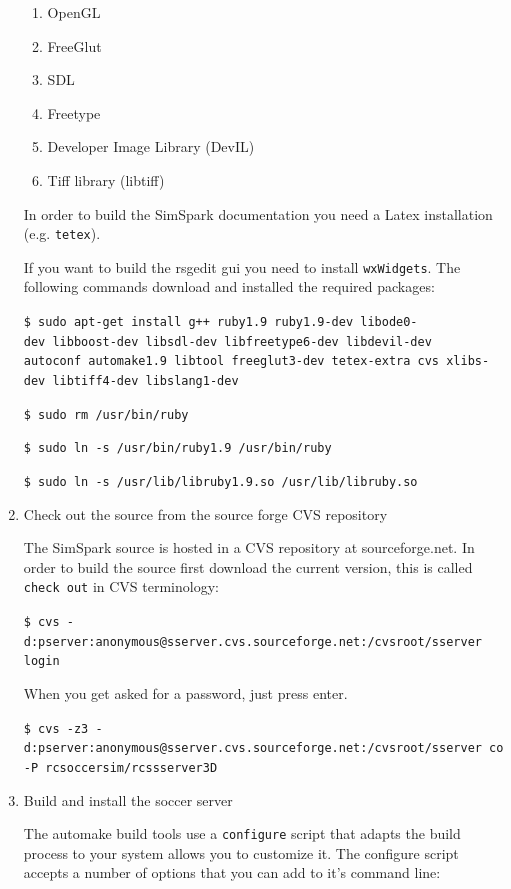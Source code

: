 \begin{enumerate}
\begin{enumerate}
\item OpenGL
\item FreeGlut
\item SDL
\item Freetype
\item Developer Image Library (DevIL)
\item Tiff library (libtiff)
\end{enumerate}

In order to build the SimSpark documentation you need a Latex
installation (e.g. \texttt{tetex}).

If you want to build the rsgedit gui you need to install
\texttt{wxWidgets}. The following commands download and installed the required packages:

\texttt{\$ sudo apt-get install g++ ruby1.9 ruby1.9-dev libode0-dev\
libboost-dev libsdl-dev libfreetype6-dev libdevil-dev autoconf\
automake1.9 libtool freeglut3-dev tetex-extra cvs xlibs-dev\
libtiff4-dev libslang1-dev}

\texttt{\$ sudo rm /usr/bin/ruby}


\texttt{\$ sudo ln -s /usr/bin/ruby1.9 /usr/bin/ruby}


\texttt{\$ sudo ln -s /usr/lib/libruby1.9.so /usr/lib/libruby.so}

\item Check out the source from the source forge CVS repository

The SimSpark source is hosted in a CVS repository at
sourceforge.net. In order to build the source first download the
current version, this is called \texttt{check out} in CVS terminology:

\texttt{\$ cvs -d:pserver:anonymous@sserver.cvs.sourceforge.net:/cvsroot/sserver login}


When you get asked for a password, just press enter.


\texttt{\$ cvs -z3 -d:pserver:anonymous@sserver.cvs.sourceforge.net:/cvsroot/sserver co -P rcsoccersim/rcssserver3D}


\item Build and install the soccer server

The automake build tools use a \texttt{configure} script that adapts
the build process to your system allows you to customize it. The
configure script accepts a number of options that you can add to it's
command line:

\begin{enumerate}


\end{enumerate}
\end{enumerate}
